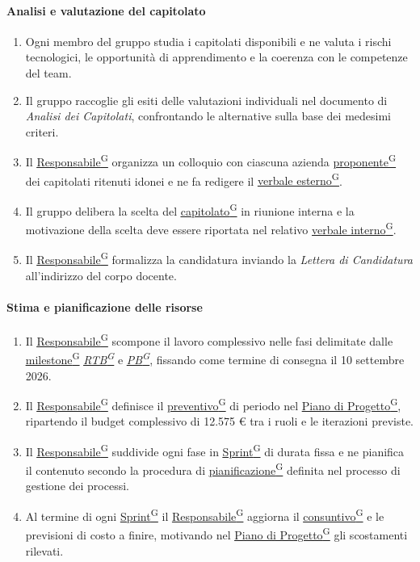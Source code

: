 \documentclass[a4paper,12pt]{article}
\providecommand{\glslink}[2]{\href{https://alittlebyte-19.github.io/Documentazione/glossario.html\#gls-#1}{\underline{#2}\textsuperscript{\scriptsize G}}}
\begin{document}
\paragraph{Analisi e valutazione del capitolato}
\begin{enumerate}
    \item Ogni membro del gruppo studia i capitolati disponibili e ne valuta i rischi tecnologici, le opportunità di apprendimento e la coerenza con le competenze del team.
    \item Il gruppo raccoglie gli esiti delle valutazioni individuali nel documento di \textit{Analisi dei Capitolati}, confrontando le alternative sulla base dei medesimi criteri.
    \item Il \glslink{responsabile}{Responsabile} organizza un colloquio con ciascuna azienda \glslink{committente-proponente}{proponente} dei capitolati ritenuti idonei e ne fa redigere il \glslink{verbale-esterno}{verbale esterno}.
    \item Il gruppo delibera la scelta del \glslink{capitolato}{capitolato} in riunione interna e la motivazione della scelta deve essere riportata nel relativo \glslink{verbale-interno}{verbale interno}.
    \item Il \glslink{responsabile}{Responsabile} formalizza la candidatura inviando la \textit{Lettera di Candidatura} all'indirizzo del corpo docente.
\end{enumerate}

\paragraph{Stima e pianificazione delle risorse}
\begin{enumerate}
    \item Il \glslink{responsabile}{Responsabile} scompone il lavoro complessivo nelle fasi delimitate dalle \glslink{milestone}{milestone} \textit{\glslink{rtb-requirements-and-technology-baseline}{RTB}} e \textit{\glslink{pb-product-baseline}{PB}}, fissando come termine di consegna il 10 settembre 2026.
    \item Il \glslink{responsabile}{Responsabile} definisce il \glslink{preventivo}{preventivo} di periodo nel \glslink{piano-di-progetto}{Piano di Progetto}, ripartendo il budget complessivo di 12.575 € tra i ruoli e le iterazioni previste.
    \item Il \glslink{responsabile}{Responsabile} suddivide ogni fase in \glslink{sprint}{Sprint} di durata fissa e ne pianifica il contenuto secondo la procedura di \glslink{pianificazione}{pianificazione} definita nel processo di gestione dei processi.
    \item Al termine di ogni \glslink{sprint}{Sprint} il \glslink{responsabile}{Responsabile} aggiorna il \glslink{consuntivo}{consuntivo} e le previsioni di costo a finire, motivando nel \glslink{piano-di-progetto}{Piano di Progetto} gli scostamenti rilevati.
\end{enumerate}
\end{document}
